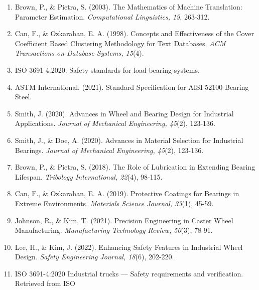 \documentclass[../../main]{subfiles}
\begin{document}
\begin{enumerate}
\def\labelenumi{\arabic{enumi}.}
\item
  Brown, P., \& Pietra, S. (2003). The Mathematics of Machine
  Translation: Parameter Estimation. \emph{Computational Linguistics,
  19}, 263-312.
\item
  Can, F., \& Ozkarahan, E. A. (1998). Concepts and Effectiveness of the
  Cover Coefficient Based Clustering Methodology for Text Databases.
  \emph{ACM Transactions on Database Systems, 15}(4).
\item
  ISO 3691-4:2020. Safety standards for load-bearing systems.
\item
  ASTM International. (2021). Standard Specification for AISI 52100
  Bearing Steel.
\item
  Smith, J. (2020). Advances in Wheel and Bearing Design for Industrial
  Applications. \emph{Journal of Mechanical Engineering, 45}(2),
  123-136.
\item
  Smith, J., \& Doe, A. (2020). Advances in Material Selection for
  Industrial Bearings. \emph{Journal of Mechanical Engineering, 45}(2),
  123-136.
\item
  Brown, P., \& Pietra, S. (2018). The Role of Lubrication in Extending
  Bearing Lifespan. \emph{Tribology International, 22}(4), 98-115.
\item
  Can, F., \& Ozkarahan, E. A. (2019). Protective Coatings for Bearings
  in Extreme Environments. \emph{Materials Science Journal, 33}(1),
  45-59.
\item
  Johnson, R., \& Kim, T. (2021). Precision Engineering in Caster Wheel
  Manufacturing. \emph{Manufacturing Technology Review, 50}(3), 78-91.
\item
  Lee, H., \& Kim, J. (2022). Enhancing Safety Features in Industrial
  Wheel Design. \emph{Safety Engineering Journal, 18}(6), 202-220.
\item
  ISO 3691-4:2020 Industrial trucks --- Safety requirements and
  verification. Retrieved from ISO
\end{enumerate}
\end{document}
